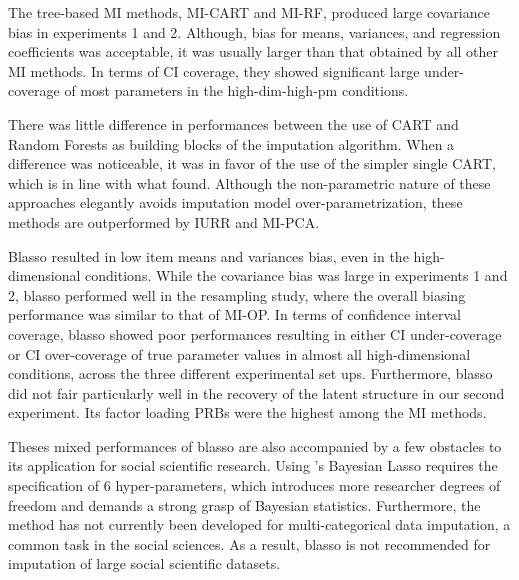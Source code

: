 	The tree-based MI methods, MI-CART and MI-RF, produced large covariance bias in experiments 1 and 2.
	Although, bias for means, variances, and regression coefficients was acceptable, it was usually larger 
	than that obtained by all other MI methods.
	In terms of CI coverage, they showed significant large under-coverage of most parameters in 
	the high-dim-high-pm conditions.

	There was little difference in performances between the use of CART and Random Forests 
	as building blocks of the imputation algorithm. 
	When a difference was noticeable, it was in favor of the use of the simpler single CART,
	which is in line with what \cite{dooveEtAl:2014} found.
	Although the non-parametric nature of these approaches elegantly avoids imputation model over-parametrization,
	these methods are outperformed by IURR and MI-PCA.

	Blasso resulted in low item means and variances bias, even in the high-dimensional conditions.
	While the covariance bias was large in experiments 1 and 2, blasso performed well in the resampling study, 
	where the overall biasing performance was similar to that of MI-OP.
	In terms of confidence interval coverage, blasso showed poor performances resulting in either CI 
	under-coverage or CI over-coverage of true parameter values in almost all high-dimensional conditions, 
	across the three different experimental set ups.
	Furthermore, blasso did not fair particularly well in the recovery of the latent structure in our second 
	experiment.
	Its factor loading PRBs were the highest among the MI methods.

	Theses mixed performances of blasso are also accompanied by a few obstacles to its application for social 
	scientific research.
	Using \cite{hans:2010}'s Bayesian Lasso requires the specification of 6 hyper-parameters, which 
	introduces more researcher degrees of freedom and demands a strong grasp of Bayesian statistics.
	Furthermore, the method has not currently been developed for multi-categorical data imputation,
	a common task in the social sciences.
	As a result, blasso is not recommended for imputation of large social scientific datasets.
